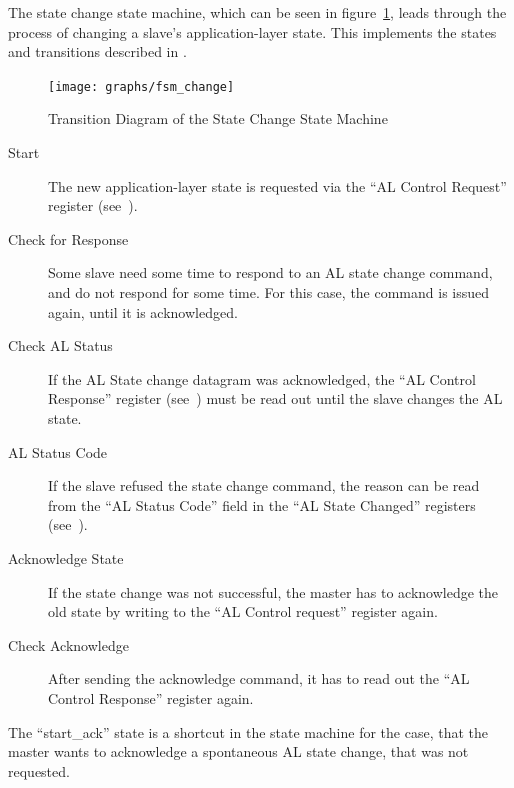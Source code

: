 \documentclass[a4paper,12pt,BCOR6mm,bibtotoc,idxtotoc]{scrbook}
\begin{document}
The state change state machine, which can be seen in
figure~\ref{fig:fsm-change}, leads through the process of changing a slave's
application-layer state. This implements the states and transitions described
in \cite[sec.~6.4.1]{alspec}.

\begin{figure}[htbp]
  \centering
  \texttt{[image: graphs/fsm\_change]}
  \caption{Transition Diagram of the State Change State Machine}
  \label{fig:fsm-change}
\end{figure}

\begin{description}

\item[Start] The new application-layer state is requested via the ``AL Control
Request'' register (see~\cite[sec. 5.3.1]{alspec}).

\item[Check for Response] Some slave need some time to respond to an AL state
change command, and do not respond for some time. For this case, the command
is issued again, until it is acknowledged.

\item[Check AL Status] If the AL State change datagram was acknowledged, the
``AL Control Response'' register (see~\cite[sec. 5.3.2]{alspec}) must be read
out until the slave changes the AL state.

\item[AL Status Code] If the slave refused the state change command, the
reason can be read from the ``AL Status Code'' field in the ``AL State
Changed'' registers (see~\cite[sec. 5.3.3]{alspec}).

\item[Acknowledge State] If the state change was not successful, the master
has to acknowledge the old state by writing to the ``AL Control request''
register again.

\item[Check Acknowledge] After sending the acknowledge command, it has to read
out the ``AL Control Response'' register again.

\end{description}

The ``start\_ack'' state is a shortcut in the state machine for the case, that
the master wants to acknowledge a spontaneous AL state change, that was not
requested.

\end{document}
